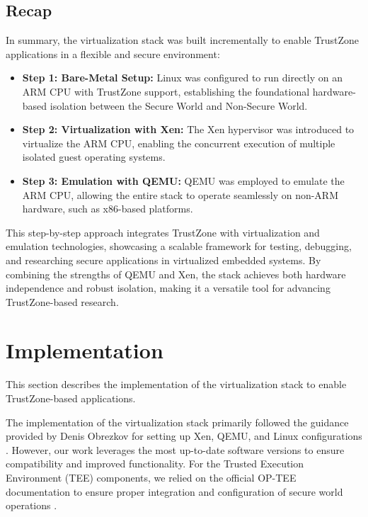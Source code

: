 \documentclass[acmtog]{acmart}
\begin{document}
\subsection{Recap}
In summary, the virtualization stack was built incrementally to enable TrustZone applications in a flexible and secure environment:
\begin{itemize}
    \item \textbf{Step 1: Bare-Metal Setup:} Linux was configured to run directly on an ARM CPU with TrustZone support, establishing the foundational hardware-based isolation between the Secure World and Non-Secure World.
    \item \textbf{Step 2: Virtualization with Xen:} The Xen hypervisor was introduced to virtualize the ARM CPU, enabling the concurrent execution of multiple isolated guest operating systems.
    \item \textbf{Step 3: Emulation with QEMU:} QEMU was employed to emulate the ARM CPU, allowing the entire stack to operate seamlessly on non-ARM hardware, such as x86-based platforms.
\end{itemize}

This step-by-step approach integrates TrustZone with virtualization and emulation technologies, showcasing a scalable framework for testing, debugging, and researching secure applications in virtualized embedded systems. By combining the strengths of QEMU and Xen, the stack achieves both hardware independence and robust isolation, making it a versatile tool for advancing TrustZone-based research.



\section{Implementation}

This section describes the implementation of the virtualization stack to enable TrustZone-based applications. 

The implementation of the virtualization stack primarily followed the guidance provided by Denis Obrezkov for setting up Xen, QEMU, and Linux configurations \cite{obrezkov2019xen}. However, our work leverages the most up-to-date software versions to ensure compatibility and improved functionality. For the Trusted Execution Environment (TEE) components, we relied on the official OP-TEE documentation to ensure proper integration and configuration of secure world operations \cite{optee_docs}.
\end{document}

